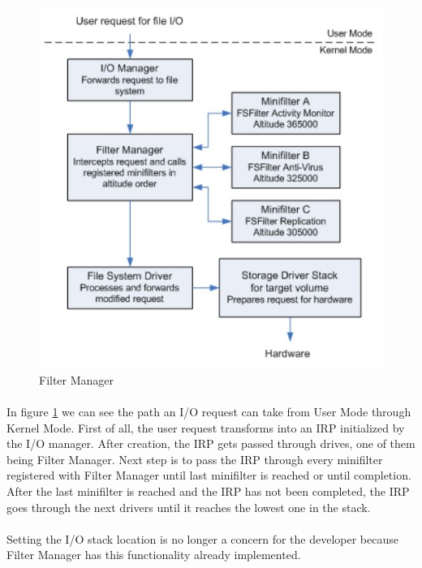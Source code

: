 		\begin{figure}[h!]
			\begin{center}
				\includegraphics{images/FilterManager.jpg}
				\caption{Filter Manager \cite{MSDNFltMgrConcepts}}
				\label{fig:filterManager}
			\end{center}
		\end{figure}
		
		
		\paragraph{}
		In figure \ref{fig:filterManager} we can see the path an I/O request can take from User Mode through Kernel Mode. First of all, the user request transforms into an IRP initialized by the I/O manager. After creation, the IRP gets passed through drives, one of them being Filter Manager. Next step is to pass the IRP through every minifilter registered with Filter Manager until  last minifilter is reached or until completion. After the last minifilter is reached and the IRP has not been completed, the IRP goes through the next drivers until it reaches the lowest one in the stack.
		
		\paragraph{}
		Setting the I/O stack location is no longer a concern for the developer because Filter Manager has this functionality already implemented.
			
